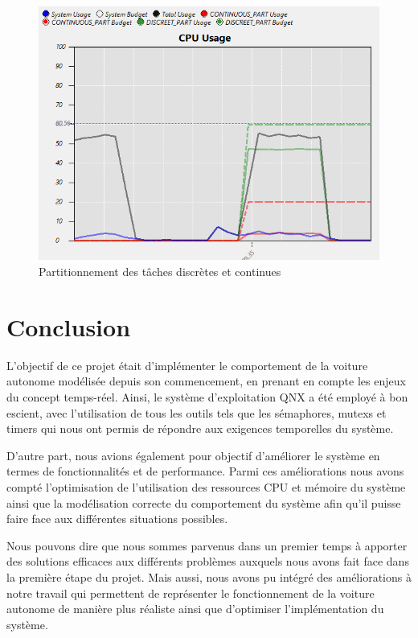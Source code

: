 \documentclass[conference]{IEEEtran}
\begin{document}
\begin{figure}[h]
    \centering
    \includegraphics[width=\linewidth]{partitionnement.png}
    \caption{Partitionnement des tâches discrètes et continues}
    \label{fig:partitionnement}
\end{figure}

\section{Conclusion}

L'objectif de ce projet était d'implémenter le comportement de la voiture autonome modélisée depuis son commencement, en prenant en compte les enjeux du concept temps-réel. Ainsi, le système d'exploitation QNX a été employé à bon escient, avec l'utilisation de tous les outils tels que les sémaphores, mutexs et timers qui nous ont permis de répondre aux exigences temporelles du système. 

D'autre part, nous avions également pour objectif d'améliorer le système en termes de fonctionnalités et de performance. Parmi ces améliorations nous avons compté l'optimisation de l'utilisation des ressources CPU et mémoire du système ainsi que la modélisation correcte du comportement du système afin qu'il puisse faire face aux différentes situations possibles.

Nous pouvons dire que nous sommes parvenus dans un premier temps à apporter des solutions efficaces aux différents problèmes auxquels nous avons fait face dans la première étape du projet. Mais aussi, nous avons pu intégré des améliorations à notre travail qui permettent de représenter le fonctionnement de la voiture autonome de manière plus réaliste ainsi que d'optimiser l'implémentation du système.
\end{document}
